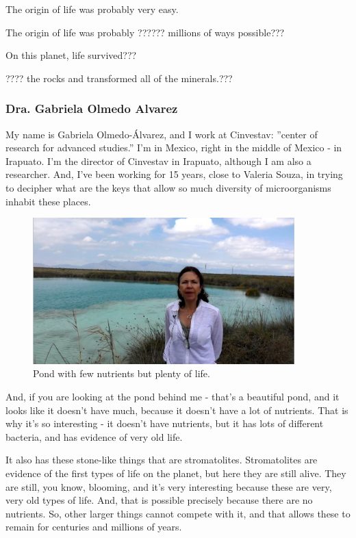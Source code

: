 \documentclass[]{article}
\begin{document}
The origin of life was probably very easy.

The origin of life was probably ??????
millions of ways possible???

On this planet, life survived???

???? the rocks
and transformed all of the minerals.???
\subsubsection{Dra. Gabriela Olmedo Alvarez}
My name is Gabriela Olmedo-Álvarez, and I work at Cinvestav: ''center of research for advanced studies.'' I'm in Mexico, right in the middle of Mexico - in Irapuato. I'm the director of Cinvestav in Irapuato, although I am also a researcher. And, I've been working for 15 years, close to Valeria Souza, in trying to decipher what are the keys that allow so much diversity of microorganisms inhabit these places.

\begin{figure}[H]
	\caption{Pond with few nutrients but plenty of life.} 
	\includegraphics[width=0.9\textwidth]{CuatroCienegas4}
\end{figure}

And, if you are looking at the pond behind me - that's a beautiful pond, and it looks like it doesn't have much, because it doesn't have a lot of nutrients. That is why it's so interesting - it doesn't have nutrients, but it has lots of different bacteria, and has evidence of very old life.

It also has these stone-like things that are stromatolites. Stromatolites are evidence of the first types of life on the planet, but here they are still alive. They are still, you know, blooming, and it's very interesting because these are very, very old types of life. And, that is possible precisely because there are no nutrients. So, other larger things
cannot compete with it, and that allows these to remain for centuries and millions of years.
\end{document}
